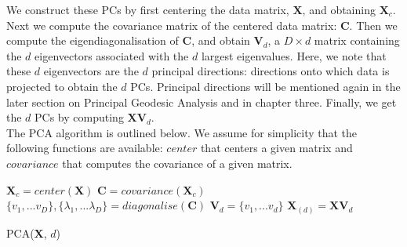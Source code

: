 \documentclass[12pt]{report}
\begin{document}
We construct these PCs by first centering the data matrix, $\mathbf{X}$, and
obtaining $\mathbf{X}_c$. Next we compute the covariance matrix of 
the centered data matrix: $\mathbf{C}$.
Then we compute the eigendiagonalisation of $\mathbf{C}$,
and obtain $\mathbf{V}_d$, a $D \times d$ matrix 
containing the $d$ eigenvectors associated 
with the $d$ largest eigenvalues. Here, we note that these $d$ eigenvectors
are the $d$ principal directions: directions onto which data is projected to
obtain the $d$ PCs. Principal directions will be mentioned
again in the later section on Principal Geodesic Analysis and in 
chapter three.
Finally, we get the $d$ PCs by computing $\mathbf{X}\mathbf{V}_d$.
\\
The PCA algorithm is outlined below. We assume for simplicity that the 
following functions are available:
$center$ that centers a given matrix and $covariance$ that computes the covariance
of a given matrix.
\begin{algorithm}
    $\mathbf{X}_c = center(\mathbf{X})$\;
    $\mathbf{C} = covariance(\mathbf{X}_c)$\;
    $\{v_1,...v_D\}, \{\lambda_1,...\lambda_D\} = diagonalise(\mathbf{C})$\;
    $\mathbf{V}_d = \{v_1,...v_d\}$\;
    $\mathbf{X}_{(d)} = \mathbf{X}\mathbf{V}_{d}$\;
    \caption{PCA($\mathbf{X}$, $d$)}
\end{algorithm}
\end{document}
